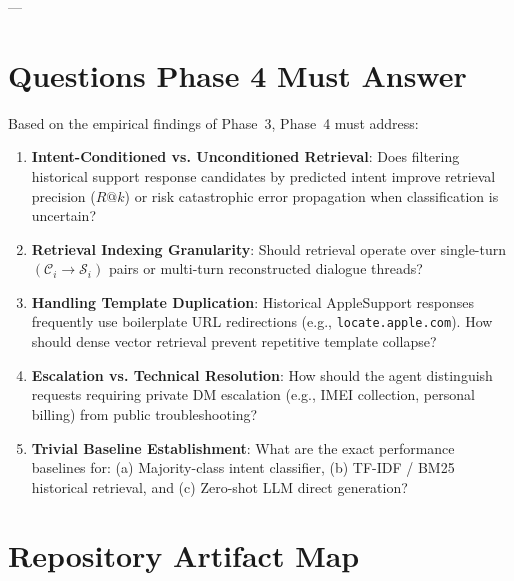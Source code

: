 \documentclass[11pt,a4paper]{article}
\begin{document}
---

\section{Questions Phase 4 Must Answer}

Based on the empirical findings of Phase~3, Phase~4 must address:
\begin{enumerate}[leftmargin=*]
    \item \textbf{Intent-Conditioned vs. Unconditioned Retrieval}: Does filtering historical support response candidates by predicted intent improve retrieval precision ($R@k$) or risk catastrophic error propagation when classification is uncertain?
    \item \textbf{Retrieval Indexing Granularity}: Should retrieval operate over single-turn $(\mathcal{C}_i \rightarrow \mathcal{S}_i)$ pairs or multi-turn reconstructed dialogue threads?
    \item \textbf{Handling Template Duplication}: Historical AppleSupport responses frequently use boilerplate URL redirections (e.g., \texttt{locate.apple.com}). How should dense vector retrieval prevent repetitive template collapse?
    \item \textbf{Escalation vs. Technical Resolution}: How should the agent distinguish requests requiring private DM escalation (e.g., IMEI collection, personal billing) from public troubleshooting?
    \item \textbf{Trivial Baseline Establishment}: What are the exact performance baselines for: (a) Majority-class intent classifier, (b) TF-IDF / BM25 historical retrieval, and (c) Zero-shot LLM direct generation?
\end{enumerate}

\newpage
\appendix

\section{Repository Artifact Map}
\end{document}
